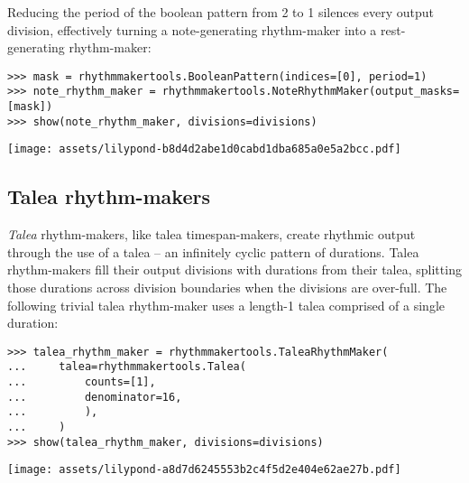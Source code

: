 \noindent Reducing the period of the boolean pattern from 2 to 1 silences every
output division, effectively turning a note-generating rhythm-maker into a
rest-generating rhythm-maker:

\begin{comment}
<abjad>
mask = rhythmmakertools.BooleanPattern(indices=[0], period=1)
note_rhythm_maker = rhythmmakertools.NoteRhythmMaker(output_masks=[mask])
show(note_rhythm_maker, divisions=divisions)
</abjad>
\end{comment}

\begin{abjadbookoutput}
\begin{singlespacing}
\vspace{-0.5\baselineskip}
\begin{verbatim}
>>> mask = rhythmmakertools.BooleanPattern(indices=[0], period=1)
>>> note_rhythm_maker = rhythmmakertools.NoteRhythmMaker(output_masks=[mask])
>>> show(note_rhythm_maker, divisions=divisions)
\end{verbatim}
\noindent\texttt{[image: assets/lilypond-b8d4d2abe1d0cabd1dba685a0e5a2bcc.pdf]}
\end{singlespacing}
\end{abjadbookoutput}

\subsection{Talea rhythm-makers}
\label{ssec:talea-rhythm-makers}

\emph{Talea} rhythm-makers, like talea timespan-makers, create rhythmic output through
the use of a talea -- an infinitely cyclic pattern of durations. Talea
rhythm-makers fill their output divisions with durations from their talea,
splitting those durations across division boundaries when the divisions are
over-full. The following trivial talea rhythm-maker uses a length-1 talea
comprised of a single  duration:

\begin{comment}
<abjad>
talea_rhythm_maker = rhythmmakertools.TaleaRhythmMaker(
    talea=rhythmmakertools.Talea(
        counts=[1],
        denominator=16,
        ),
    )
show(talea_rhythm_maker, divisions=divisions)
</abjad>
\end{comment}

\begin{abjadbookoutput}
\begin{singlespacing}
\vspace{-0.5\baselineskip}
\begin{verbatim}
>>> talea_rhythm_maker = rhythmmakertools.TaleaRhythmMaker(
...     talea=rhythmmakertools.Talea(
...         counts=[1],
...         denominator=16,
...         ),
...     )
>>> show(talea_rhythm_maker, divisions=divisions)
\end{verbatim}
\noindent\texttt{[image: assets/lilypond-a8d7d6245553b2c4f5d2e404e62ae27b.pdf]}
\end{singlespacing}
\end{abjadbookoutput}

